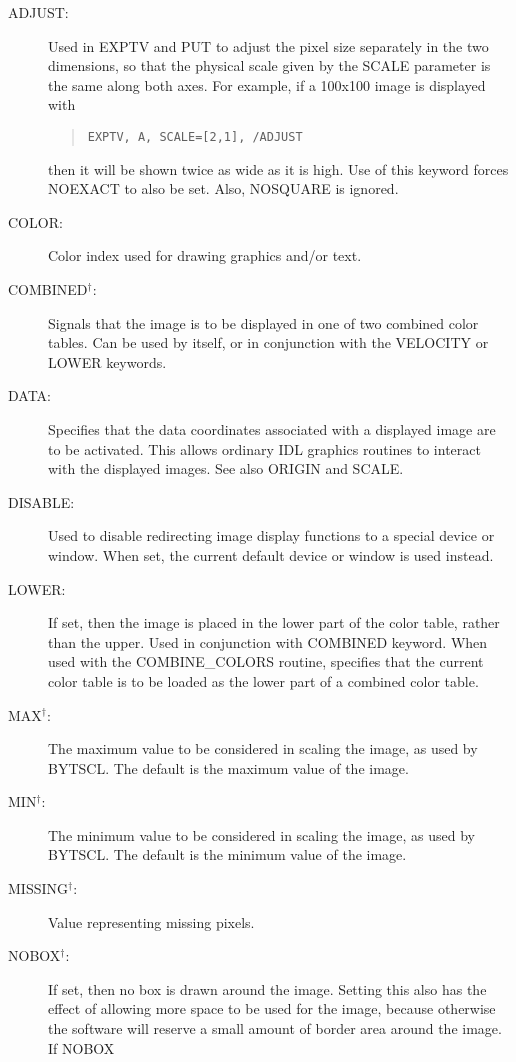 \begin{description}
\item[ADJUST:]
Used in EXPTV and PUT to adjust the pixel size separately in the two
dimensions, so that the physical scale given by the SCALE parameter is the same
along both axes.  For example, if a 100x100 image is displayed with
\begin{quote}
\begin{verbatim}
EXPTV, A, SCALE=[2,1], /ADJUST
\end{verbatim}
\end{quote}
then it will be shown twice as wide as it is high.  Use of this keyword forces
NOEXACT to also be set.  Also, NOSQUARE is ignored.
\item[COLOR:]
Color index used for drawing graphics and/or text.
\item[COMBINED$^\dagger$:]
Signals that the image is to be displayed in one of two combined color tables.
Can be used by itself, or in conjunction with the VELOCITY or LOWER keywords.
\item[DATA:]
Specifies that the data coordinates associated with a displayed image are to be
activated.  This allows ordinary IDL graphics routines to interact with the
displayed images.  See also ORIGIN and SCALE.
\item[DISABLE:]
Used to disable redirecting image display functions to a special device or
window.  When set, the current default device or window is used instead.
\item[LOWER:]
If set, then the image is placed in the lower part of the color table, rather
than the upper.  Used in conjunction with COMBINED keyword.  When used with the
COMBINE\_COLORS routine, specifies that the current color table is to be loaded
as the lower part of a combined color table.
\item[MAX$^\dagger$:]
The maximum value to be considered in scaling the image, as used by BYTSCL.
The default is the maximum value of the image.
\item[MIN$^\dagger$:]
The minimum value to be considered in scaling the image, as used by BYTSCL.
The default is the minimum value of the image.
\item[MISSING$^\dagger$:]
Value representing missing pixels.
\item[NOBOX$^\dagger$:]
If set, then no box is drawn around the image.  Setting this also has the
effect of allowing more space to be used for the image, because otherwise the
software will reserve a small amount of border area around the image.  If NOBOX

\end{description}
